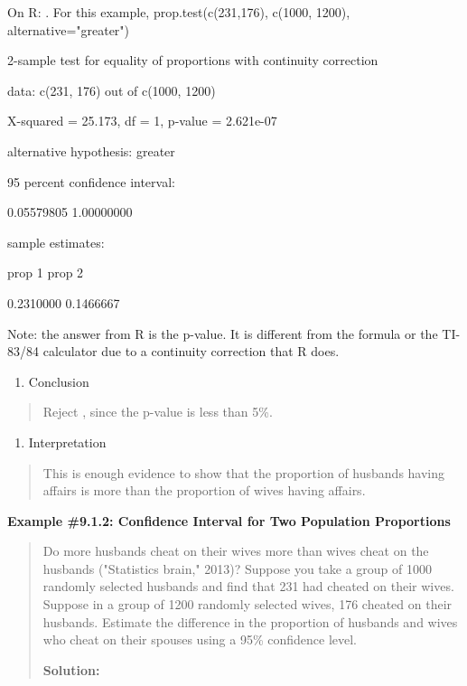 \documentclass[]{book}
\providecommand{\tightlist}{%
  \setlength{\itemsep}{0pt}\setlength{\parskip}{0pt}}
\begin{document}
On R: . For this example, prop.test(c(231,176), c(1000, 1200),
alternative="greater")

2-sample test for equality of proportions with continuity correction

data: c(231, 176) out of c(1000, 1200)

X-squared = 25.173, df = 1, p-value = 2.621e-07

alternative hypothesis: greater

95 percent confidence interval:

0.05579805 1.00000000

sample estimates:

prop 1 prop 2

0.2310000 0.1466667

Note: the answer from R is the p-value. It is different from the formula
or the TI-83/84 calculator due to a continuity correction that R does.

\begin{enumerate}
\def\labelenumi{\arabic{enumi}.}
\setcounter{enumi}{4}
\tightlist
\item
  Conclusion
\end{enumerate}

\begin{quote}
Reject , since the p-value is less than 5\%.
\end{quote}

\begin{enumerate}
\def\labelenumi{\arabic{enumi}.}
\setcounter{enumi}{5}
\tightlist
\item
  Interpretation
\end{enumerate}

\begin{quote}
This is enough evidence to show that the proportion of husbands having
affairs is more than the proportion of wives having affairs.
\end{quote}

\textbf{Example \#9.1.2: Confidence Interval for Two Population Proportions}

\begin{quote}
Do more husbands cheat on their wives more than wives cheat on the
husbands ("Statistics brain," 2013)? Suppose you take a group of
1000 randomly selected husbands and find that 231 had cheated on their
wives. Suppose in a group of 1200 randomly selected wives, 176 cheated
on their husbands. Estimate the difference in the proportion of
husbands and wives who cheat on their spouses using a 95\% confidence
level.

\textbf{Solution:}
\end{quote}
\end{document}
